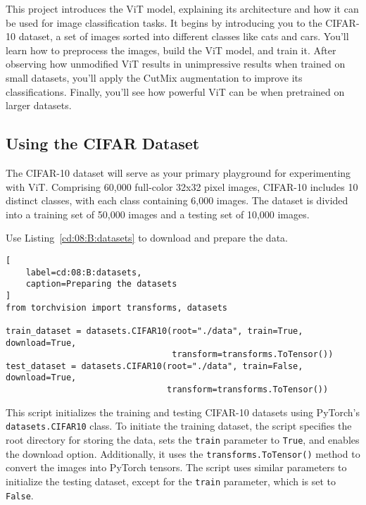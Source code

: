 This project introduces the ViT model, explaining its architecture and how it can be used for image classification tasks. 
It begins by introducing you to the CIFAR-10 dataset, a set of images sorted into different classes like cats and cars. You'll learn how to preprocess the images, build the ViT model, and train it. After observing how unmodified ViT results in unimpressive results when trained on small datasets, you'll apply the CutMix augmentation to improve its classifications. Finally, you'll see how powerful ViT can be when pretrained on larger datasets.

\subsection{Using the CIFAR Dataset}

The CIFAR-10 dataset will serve as your primary playground for experimenting with ViT.
Comprising 60,000 full-color 32x32 pixel images, CIFAR-10 includes 10 distinct classes, with each class containing 6,000 images. The dataset is divided into a training set of 50,000 images and a testing set of 10,000 images.

Use Listing~\ref{cd:08:B:datasets} to download and prepare the data.
\begin{lstlisting}[
    label=cd:08:B:datasets,
    caption=Preparing the datasets
]
from torchvision import transforms, datasets

train_dataset = datasets.CIFAR10(root="./data", train=True, download=True, 
                                 transform=transforms.ToTensor())
test_dataset = datasets.CIFAR10(root="./data", train=False, download=True, 
                                transform=transforms.ToTensor())
\end{lstlisting}
This script initializes the training and testing CIFAR-10 datasets using PyTorch's \lstinline{datasets.CIFAR10} class. 
To initiate the training dataset, the script specifies the root directory for storing the data, sets the \lstinline{train} parameter to \lstinline{True}, and enables the download option. Additionally, it uses the \lstinline{transforms.ToTensor()} method to convert the images into PyTorch tensors. The script uses similar parameters to initialize the testing dataset, except for the \lstinline{train} parameter, which is set to \lstinline{False}.

